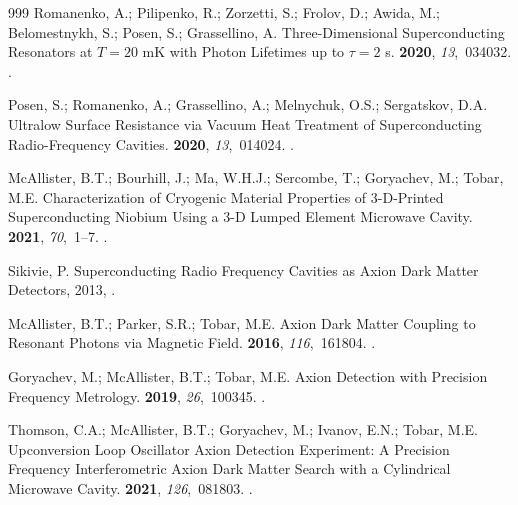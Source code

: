 \documentclass[
  aps,
  physrev,
  reprint,
  superscriptaddress,
  nofootinbib,
  amsmath,
  amssymb
]{revtex4-2}
\begin{document}
\begin{thebibliography}{999}
Romanenko, A.; Pilipenko, R.; Zorzetti, S.; Frolov, D.; Awida, M.;
  Belomestnykh, S.; Posen, S.; Grassellino, A.
\newblock Three-Dimensional Superconducting Resonators at {$T=20$ mK} with
  Photon Lifetimes up to {$\tau=2$ s}.
 {\bf 2020}, {\em 13},~034032.
.

Posen, S.; Romanenko, A.; Grassellino, A.; Melnychuk, O.S.; Sergatskov, D.A.
\newblock Ultralow Surface Resistance via Vacuum Heat Treatment of
  Superconducting Radio-Frequency Cavities.
 {\bf 2020}, {\em 13},~014024.
.

McAllister, B.T.; Bourhill, J.; Ma, W.H.J.; Sercombe, T.; Goryachev, M.; Tobar,
  M.E.
\newblock Characterization of Cryogenic Material Properties of {3-D}-Printed
  Superconducting Niobium Using a {3-D} Lumped Element Microwave Cavity.
 {\bf
  2021}, {\em 70},~1--7.
.

Sikivie, P.
\newblock Superconducting {{Radio Frequency Cavities}} as {{Axion Dark Matter
  Detectors}},  2013,  \href{http://arxiv.org/abs/1009.0762}{{}}.

McAllister, B.T.; Parker, S.R.; Tobar, M.E.
\newblock Axion Dark Matter Coupling to Resonant Photons via Magnetic Field.
 {\bf 2016}, {\em 116},~161804.
.

Goryachev, M.; McAllister, B.T.; Tobar, M.E.
\newblock Axion Detection with Precision Frequency Metrology.
 {\bf 2019}, {\em 26},~100345.
.

Thomson, C.A.; McAllister, B.T.; Goryachev, M.; Ivanov, E.N.; Tobar, M.E.
\newblock Upconversion Loop Oscillator Axion Detection Experiment: A Precision
  Frequency Interferometric Axion Dark Matter Search with a Cylindrical
  Microwave Cavity.
 {\bf 2021}, {\em 126},~081803.
.


\end{thebibliography}
\end{document}
